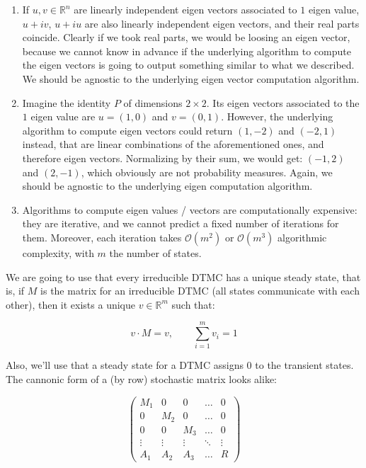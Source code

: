 \documentclass[
  nojss]{jss}
\begin{document}
\begin{enumerate}
\def\labelenumi{\arabic{enumi}.}
\item
  If \(u, v \in \mathbb{R}^n\) are linearly independent eigen vectors associated to \(1\) eigen value, \(u + iv\), \(u + iu\) are also linearly independent eigen vectors, and their real parts coincide. Clearly if we took real parts, we would be loosing an eigen vector, because we cannot know in advance if the underlying algorithm to compute the eigen vectors is going to output something similar to what we described. We should be agnostic to the underlying eigen vector computation algorithm.
\item
  Imagine the identity \(P\) of dimensions \(2 \times 2\). Its eigen vectors associated to the \(1\) eigen value are \(u = (1, 0)\) and \(v = (0, 1)\). However, the underlying algorithm to compute eigen vectors could return \((1, -2)\) and \((-2, 1)\) instead, that are linear combinations of the aforementioned ones, and therefore eigen vectors. Normalizing by their sum, we would get: \((-1, 2)\) and \((2, -1)\), which obviously are not probability measures. Again, we should be agnostic to the underlying eigen computation algorithm.
\item
  Algorithms to compute eigen values / vectors are computationally expensive: they are iterative, and we cannot predict a fixed number of iterations for them. Moreover, each iteration takes \(\mathcal{O}(m^2)\) or \(\mathcal{O}(m^3)\) algorithmic complexity, with \(m\) the number of states.
\end{enumerate}

We are going to use that every irreducible DTMC has a unique steady state, that is, if \(M\) is the matrix for an irreducible DTMC (all states communicate with each other), then it exists a unique \(v \in \mathbb{R}^m\) such that:

\[ v \cdot M = v, \qquad \sum_{i = 1}^m v_i = 1 \]

Also, we'll use that a steady state for a DTMC assigns \(0\) to the transient states. The cannonic form of a (by row) stochastic matrix looks alike:

\[
\left(\begin{array}{c|c|c|c|c}
M_1 & 0 & 0 & \ldots & 0 \\
\hline
0 & M_2 & 0 & \ldots & 0 \\
\hline
0 & 0 & M_3 & \ldots & 0 \\
\hline
\vdots & \vdots & \vdots & \ddots & \vdots \\
\hline
A_1 & A_2 & A_3 & \ldots & R
\end{array}\right)
\]
\end{document}
